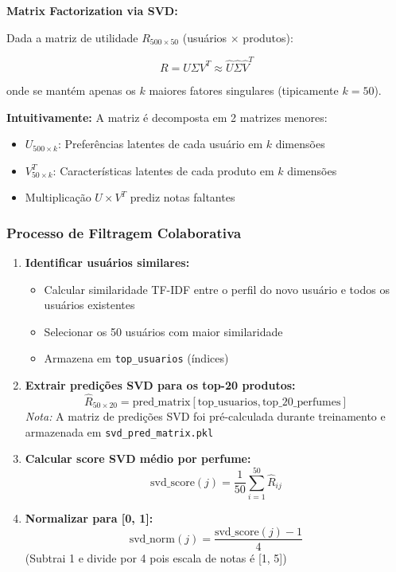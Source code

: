 \documentclass[12pt,a4paper]{article}
\begin{document}
\textbf{Matrix Factorization via SVD:}

Dada a matriz de utilidade $R_{500 \times 50}$ (usuários $\times$ produtos):

\begin{equation}
R = U \Sigma V^T \approx \hat{U} \hat{\Sigma} \hat{V}^T
\end{equation}

onde se mantém apenas os $k$ maiores fatores singulares (tipicamente $k = 50$).

\textbf{Intuitivamente:} A matriz é decomposta em 2 matrizes menores:
\begin{itemize}
    \item $U_{500 \times k}$: Preferências latentes de cada usuário em $k$ dimensões
    \item $V_{50 \times k}^T$: Características latentes de cada produto em $k$ dimensões
    \item Multiplicação $U \times V^T$ prediz notas faltantes
\end{itemize}

\subsubsection{Processo de Filtragem Colaborativa}

\begin{enumerate}
    \item \textbf{Identificar usuários similares:}
    \begin{itemize}
        \item Calcular similaridade TF-IDF entre o perfil do novo usuário e todos os usuários existentes
        \item Selecionar os 50 usuários com maior similaridade
        \item Armazena em \texttt{top\_usuarios} (índices)
    \end{itemize}
    
    \item \textbf{Extrair predições SVD para os top-20 produtos:}
    \begin{equation}
    \hat{R}_{50 \times 20} = \text{pred\_matrix}[\text{top\_usuarios}, \text{top\_20\_perfumes}]
    \end{equation}
    \textit{Nota:} A matriz de predições SVD foi pré-calculada durante treinamento e armazenada em \texttt{svd\_pred\_matrix.pkl}
    
    \item \textbf{Calcular score SVD médio por perfume:}
    \begin{equation}
    \text{svd\_score}(j) = \frac{1}{50} \sum_{i=1}^{50} \hat{R}_{ij}
    \end{equation}
    
    \item \textbf{Normalizar para [0, 1]:}
    \begin{equation}
    \text{svd\_norm}(j) = \frac{\text{svd\_score}(j) - 1}{4}
    \end{equation}
    (Subtrai 1 e divide por 4 pois escala de notas é [1, 5])
\end{enumerate}
\end{document}
